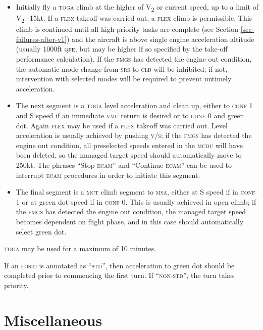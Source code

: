 \documentclass[a5paper,11pt,twoside]{book}
\newcommand{\ac}[1]{{\scshape\MakeLowercase{#1}}}
\newcommand{\cphrase}[1]{\ac{#1}}
\newcommand{\inlcite}[1]{{\ac{#1}}}
\newcommand{\multicite}[1]{%
  \nopagebreak
  \noindent{{\color{blue}\footnotesize[\inlcite{#1}]}}
}
\newcommand{\V}[1]{V\textsubscript{#1}}
\begin{document}
\begin{itemize}
\item Initially fly a \ac{TOGA} climb at the higher of \V{2} or current speed,
  up to a limit of \V{2}+15kt. If a \ac{FLEX} takeoff was carried out, a
  \ac{FLEX} climb is permissible. This climb is continued until all high
  priority tasks are complete (see Section \ref{sec-failures-after-v1}) and the aircraft is
  above single engine acceleration altitude (usually 1000ft \ac{QFE}, but may be
  higher if so specified by the take-off performance calculation). If the
  \ac{FMGS} has detected the engine out condition, the automatic mode change
  from \ac{SRS} to \ac{CLB} will be inhibited; if not, intervention with
  selected modes will be required to prevent untimely acceleration.

\item The next segment is a \ac{TOGA} level acceleration and clean up, either to
  \ac{Conf} 1 and S speed if an immediate \ac{VMC} return is desired or to
  \ac{Conf} 0 and green dot. Again \ac{FLEX} may be used if a \ac{FLEX} takeoff
  was carried out. Level acceleration is usually achieved by pushing \ac{V/S};
  if the \ac{FMGS} has detected the engine out condition, all preselected speeds
  entered in the \ac{MCDU} will have been deleted, so the managed target speed
  should automatically move to 250kt. The phrases ``Stop \ac{ECAM}'' and
  ``Continue \ac{ECAM}'' can be used to interrupt \ac{ECAM} procedures in order
  to initiate this segment.

\item The final segment is a \ac{MCT} climb segment to \ac{MSA}, either at S
  speed if in \ac{Conf} 1 or at green dot speed if in \ac{Conf} 0. This is
  usually achieved in open climb; if the \ac{FMGS} has detected the engine out
  condition, the managed target speed becomes dependent on flight phase, and in
  this case should automatically select green dot.
\end{itemize}

\ac{TOGA} may be used for a maximum of 10 minutes.

If an \ac{EOSID} is annotated as ``\cphrase{STD}'', then acceleration to green
dot should be completed prior to commencing the first turn. If
``\cphrase{NON-STD}'', the turn takes priority.

\multicite{EOMB~4.4.4, FCOM~DSC.22\_20.60.40}

\chapter{Miscellaneous}
\end{document}
